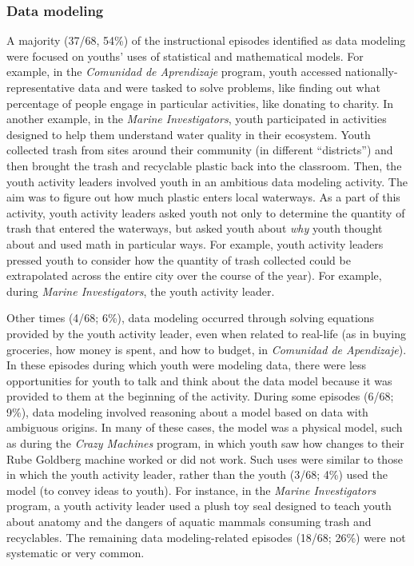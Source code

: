 \documentclass[]{msu-thesis}
\theoremstyle{definition}
\theoremstyle{definition}
\theoremstyle{definition}
\theoremstyle{remark}
\begin{document}
\subsubsection{Data modeling}\label{data-modeling}

A majority (37/68, 54\%) of the instructional episodes identified as
data modeling were focused on youths' uses of statistical and
mathematical models. For example, in the \emph{Comunidad de Aprendizaje}
program, youth accessed nationally-representative data and were tasked
to solve problems, like finding out what percentage of people engage in
particular activities, like donating to charity. In another example, in
the \emph{Marine Investigators}, youth participated in activities
designed to help them understand water quality in their ecosystem. Youth
collected trash from sites around their community (in different
``districts'') and then brought the trash and recyclable plastic back
into the classroom. Then, the youth activity leaders involved youth in
an ambitious data modeling activity. The aim was to figure out how much
plastic enters local waterways. As a part of this activity, youth
activity leaders asked youth not only to determine the quantity of trash
that entered the waterways, but asked youth about \emph{why} youth
thought about and used math in particular ways. For example, youth
activity leaders pressed youth to consider how the quantity of trash
collected could be extrapolated across the entire city over the course
of the year). For example, during \emph{Marine Investigators}, the youth
activity leader.

Other times (4/68; 6\%), data modeling occurred through solving
equations provided by the youth activity leader, even when related to
real-life (as in buying groceries, how money is spent, and how to
budget, in \emph{Comunidad de Apendizaje}). In these episodes during
which youth were modeling data, there were less opportunities for youth
to talk and think about the data model because it was provided to them
at the beginning of the activity. During some episodes (6/68; 9\%), data
modeling involved reasoning about a model based on data with ambiguous
origins. In many of these cases, the model was a physical model, such as
during the \emph{Crazy Machines} program, in which youth saw how changes
to their Rube Goldberg machine worked or did not work. Such uses were
similar to those in which the youth activity leader, rather than the
youth (3/68; 4\%) used the model (to convey ideas to youth). For
instance, in the \emph{Marine Investigators} program, a youth activity
leader used a plush toy seal designed to teach youth about anatomy and
the dangers of aquatic mammals consuming trash and recyclables. The
remaining data modeling-related episodes (18/68; 26\%) were not
systematic or very common.
\end{document}
